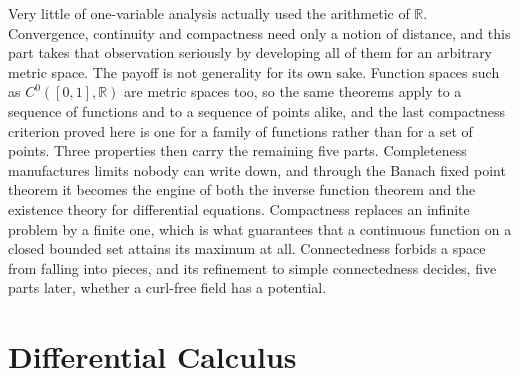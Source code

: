 \documentclass{report}
\theoremstyle{purplethm}
\theoremstyle{purplethm}
\theoremstyle{defthm}
\theoremstyle{examplethm}
\theoremstyle{questionthm}
\theoremstyle{remarkthm}
\theoremstyle{asidethm}
\theoremstyle{importantremarkthm}
\theoremstyle{remarkthm}
\theoremstyle{ainotethm}
\theoremstyle{purplethm}
\begin{document}
Very little of one-variable analysis actually used the arithmetic of $\mathbb{R}$. Convergence,
continuity and compactness need only a notion of distance, and this part takes that observation
seriously by developing all of them for an arbitrary metric space. The payoff is not generality
for its own sake. Function spaces such as $C^0([0,1],\mathbb{R})$ are metric spaces too, so the
same theorems apply to a sequence of functions and to a sequence of points alike, and the last
compactness criterion proved here is one for a family of functions rather than for a set of
points. Three properties then carry the remaining five parts. Completeness manufactures limits
nobody can write down, and through the Banach fixed point theorem it becomes the engine of both
the inverse function theorem and the existence theory for differential equations. Compactness
replaces an infinite problem by a finite one, which is what guarantees that a continuous function
on a closed bounded set attains its maximum at all. Connectedness forbids a space from falling
into pieces, and its refinement to simple connectedness decides, five parts later, whether a
curl-free field has a potential.









\part{Differential Calculus}
\end{document}
